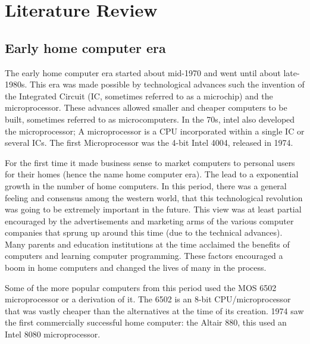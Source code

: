 

\chapter{Literature Review} %
\label{Chapter2} %

\section{Early home computer era}
The early home computer era started about mid-1970 and went until about late-1980s. This era was made possible by technological advances such the invention of the Integrated Circuit (IC, sometimes referred to as a microchip) and the microprocessor. These advances allowed smaller and cheaper computers to be built, sometimes referred to as microcomputers. In the 70s, intel also developed the microprocessor; A microprocessor is a CPU incorporated within a single IC or several ICs. The first Microprocessor was the 4-bit Intel 4004, released in 1974.

For the first time it made business sense to market computers to personal users for their homes (hence the name home computer era). The lead to a exponential growth in the number of home computers. In this period, there was a general feeling and consensus among the western world, that this technological revolution was going to be extremely important in the future. This view was at least partial encouraged by the advertisements and marketing arms of the various computer companies that sprung up around this time (due to the technical advances). Many parents and education institutions at the time acclaimed the benefits of computers and learning computer programming. These factors encouraged a boom in home computers and changed the lives of many in the process. \cite{RN23}

Some of the more popular computers from this period used the MOS 6502 microprocessor or a derivation of it. The 6502 is an 8-bit CPU/microprocessor that was vastly cheaper than the alternatives at the time of its creation. 1974 saw the first commercially successful home computer: the Altair 880, this used an Intel 8080 microprocessor. 


